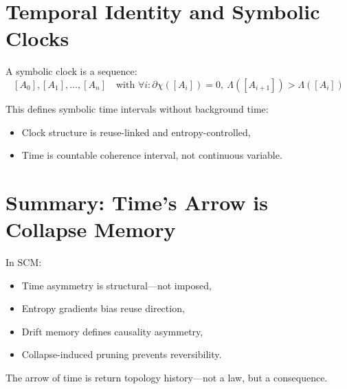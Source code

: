 \section{Temporal Identity and Symbolic Clocks} \label{sec:symbolic-clocks}

A symbolic clock is a sequence:
\[
[A_0], [A_1], \dots, [A_n] \quad \text{with } \forall i: \partial\chi([A_i]) = 0,\ \Lambda([A_{i+1}]) > \Lambda([A_i])
\]

This defines symbolic time intervals without background time:
\begin{itemize}
  \item Clock structure is reuse-linked and entropy-controlled,
  \item Time is countable coherence interval, not continuous variable.
\end{itemize}

\section{Summary: Time’s Arrow is Collapse Memory} \label{sec:arrow-summary}

In SCM:
\begin{itemize}
  \item Time asymmetry is structural—not imposed,
  \item Entropy gradients bias reuse direction,
  \item Drift memory defines causality asymmetry,
  \item Collapse-induced pruning prevents reversibility.
\end{itemize}

The arrow of time is return topology history—not a law, but a consequence.

